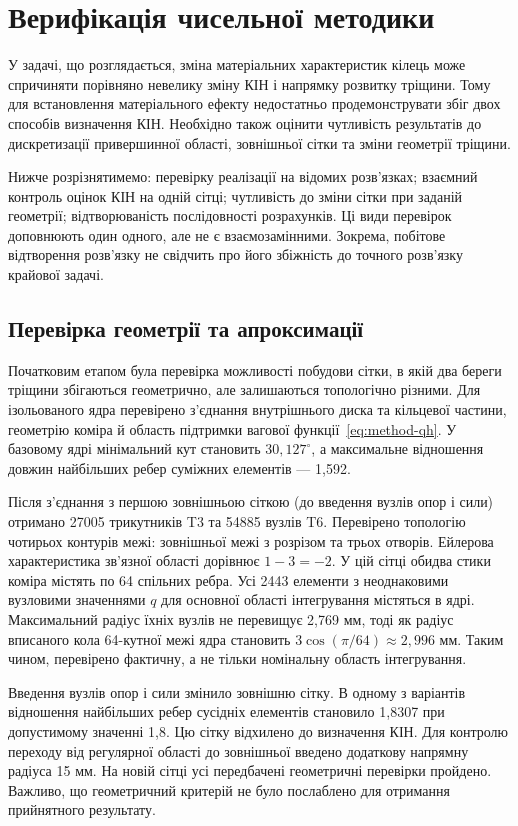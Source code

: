 \chapter{Верифікація чисельної методики}
\label{ch:verification}

У задачі, що розглядається, зміна матеріальних характеристик кілець може спричиняти порівняно невелику зміну КІН і напрямку розвитку тріщини. Тому для встановлення матеріального ефекту недостатньо продемонструвати збіг двох способів визначення КІН. Необхідно також оцінити чутливість результатів до дискретизації привершинної області, зовнішньої сітки та зміни геометрії тріщини.

Нижче розрізнятимемо: перевірку реалізації на відомих розв'язках; взаємний контроль оцінок КІН на одній сітці; чутливість до зміни сітки при заданій геометрії; відтворюваність послідовності розрахунків. Ці види перевірок доповнюють один одного, але не є взаємозамінними. Зокрема, побітове відтворення розв'язку не свідчить про його збіжність до точного розв'язку крайової задачі.

\section{Перевірка геометрії та апроксимації}
\label{sec:ver-mesh}

Початковим етапом була перевірка можливості побудови сітки, в якій два береги тріщини збігаються геометрично, але залишаються топологічно різними. Для ізольованого ядра перевірено з'єднання внутрішнього диска та кільцевої частини, геометрію коміра й область підтримки вагової функції~\eqref{eq:method-qh}. У базовому ядрі мінімальний кут становить $30{,}127^\circ$, а максимальне відношення довжин найбільших ребер суміжних елементів --- 1,592.

Після з'єднання з першою зовнішньою сіткою (до введення вузлів опор і сили) отримано 27005 трикутників T3 та 54885 вузлів T6. Перевірено топологію чотирьох контурів межі: зовнішньої межі з розрізом та трьох отворів. Ейлерова характеристика зв'язної області дорівнює $1-3=-2$. У цій сітці обидва стики коміра містять по 64 спільних ребра. Усі 2443 елементи з неоднаковими вузловими значеннями $q$ для основної області інтегрування містяться в ядрі. Максимальний радіус їхніх вузлів не перевищує 2,769 мм, тоді як радіус вписаного кола 64-кутної межі ядра становить $3\cos(\pi/64)\approx2{,}996$ мм. Таким чином, перевірено фактичну, а не тільки номінальну область інтегрування.

Введення вузлів опор і сили змінило зовнішню сітку. В одному з варіантів відношення найбільших ребер сусідніх елементів становило 1,8307 при допустимому значенні 1,8. Цю сітку відхилено до визначення КІН. Для контролю переходу від регулярної області до зовнішньої введено додаткову напрямну радіуса 15 мм. На новій сітці усі передбачені геометричні перевірки пройдено. Важливо, що геометричний критерій не було послаблено для отримання прийнятного результату.

